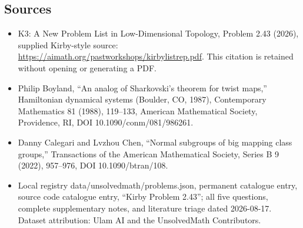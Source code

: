 \documentclass[11pt]{article}
\begin{document}
\subsection{Sources}
\begin{itemize}
\item K3: A New Problem List in Low-Dimensional Topology, Problem 2.43 (2026), supplied Kirby-style source: \url{https://aimath.org/pastworkshops/kirbylistrep.pdf}. This citation is retained without opening or generating a PDF.
\item [Boy88] Philip Boyland, ``An analog of Sharkovski's theorem for twist maps,'' Hamiltonian dynamical systems (Boulder, CO, 1987), Contemporary Mathematics 81 (1988), 119--133, American Mathematical Society, Providence, RI, DOI 10.1090/conm/081/986261.
\item [CC22] Danny Calegari and Lvzhou Chen, ``Normal subgroups of big mapping class groups,'' Transactions of the American Mathematical Society, Series B 9 (2022), 957--976, DOI 10.1090/btran/108.
\item Local registry data/unsolvedmath/problems.json, permanent catalogue entry, source code catalogue entry, ``Kirby Problem 2.43''; all five questions, complete supplementary notes, and literature triage dated 2026-08-17. Dataset attribution: Ulam AI and the UnsolvedMath Contributors.
\end{itemize}
\end{document}
